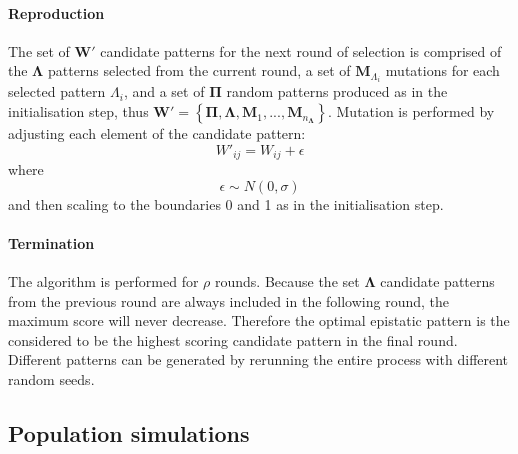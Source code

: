 \paragraph{Reproduction}

The set of $\mathbf{W}'$ candidate patterns for the next round of selection is comprised of the $\mathbf{\Lambda}$ patterns selected from the current round, a set of $\mathbf{M}_{\Lambda_i}$ mutations for each selected pattern $\Lambda_i$, and a set of $\mathbf{\Pi}$ random patterns produced as in the initialisation step, thus $\mathbf{W}' = \left\{ \mathbf{\Pi}, \mathbf{\Lambda}, \mathbf{M}_1,..., \mathbf{M}_{n_{\mathbf{\Lambda}}}\right\}$. Mutation is performed by adjusting each element of the candidate pattern:
\begin{equation}
{W}'_{ij} = W_{ij} + \epsilon
\end{equation}
where
\begin{equation}
\epsilon \sim N(0,\sigma )
\end{equation}
and then scaling to the boundaries 0 and 1 as in the initialisation step.

\paragraph{Termination}

The algorithm is performed for $\rho$ rounds. Because the set $\mathbf{\Lambda}$ candidate patterns from the previous round are always included in the following round, the maximum score will never decrease. Therefore the optimal epistatic pattern is the considered to be the highest scoring candidate pattern in the final round. Different patterns can be generated by rerunning the entire process with different random seeds.


\subsection{Population simulations}

